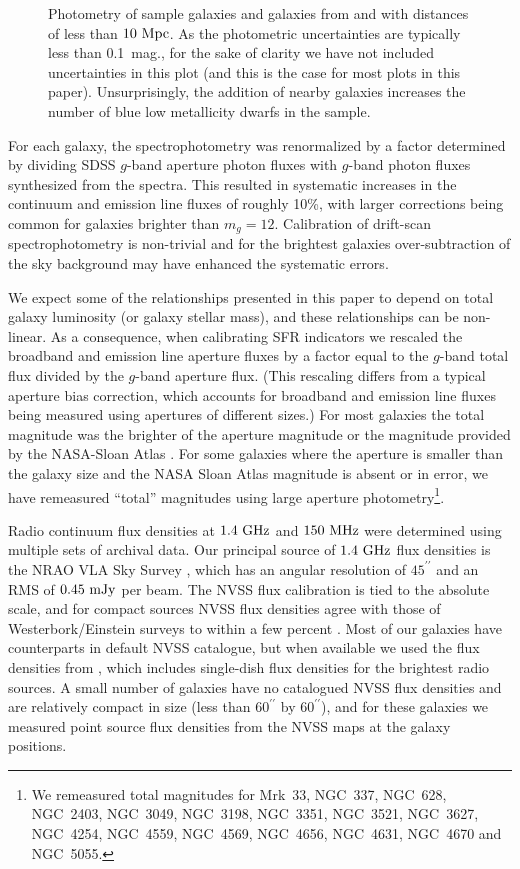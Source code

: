 \documentclass[preprint]{aastex61}
\begin{document}
\begin{figure}
\caption{Photometry of \citet{bro14} sample galaxies and galaxies from \citet{mou06} and \citet{mou10} with distances of less than $10~{\rm Mpc}$. As the photometric uncertainties are typically less than 0.1~mag., for the sake of clarity we have not included uncertainties in this plot (and this is the case for most plots in this paper). Unsurprisingly, the addition of nearby galaxies increases the number of blue low metallicity dwarfs in the sample.}
\label{fig:ugr}
\end{figure}

For each galaxy, the spectrophotometry was renormalized by a factor determined by dividing SDSS $g$-band aperture photon fluxes with $g$-band photon fluxes synthesized from the spectra. This resulted in systematic increases in the continuum and emission line fluxes of roughly 10\%, with larger corrections being common for galaxies brighter than $m_g=12$. Calibration of drift-scan spectrophotometry is non-trivial \citep[i.e.,][]{mou06,ken08} and for the brightest galaxies over-subtraction of the sky background may have enhanced the systematic errors. 

We expect some of the relationships presented in this paper to depend on total galaxy luminosity (or galaxy stellar mass), and these relationships can be non-linear. As a consequence, when calibrating SFR indicators we rescaled the broadband and emission line aperture fluxes by a factor equal to the $g$-band total flux divided by the $g$-band aperture flux. (This rescaling differs from a typical aperture bias correction, which accounts for broadband and emission line fluxes being measured using apertures of different sizes.) For most galaxies the total magnitude was the brighter of the aperture magnitude or the magnitude provided by the NASA-Sloan Atlas \citep{bla11}. For some galaxies where the aperture is smaller than the galaxy size and the NASA Sloan Atlas magnitude is absent or in error, we have remeasured ``total'' magnitudes using large aperture photometry\footnote{We remeasured total magnitudes for Mrk~33, NGC~337, NGC~628, NGC~2403, NGC~3049, NGC~3198, NGC~3351, NGC~3521, NGC~3627, NGC~4254, NGC~4559, NGC~4569, NGC~4656, NGC~4631, NGC~4670 and NGC~5055.}.

Radio continuum flux densities at $1.4~{\rm GHz}$ and $150~{\rm MHz}$ were determined using multiple sets of archival data. Our principal source of $1.4~{\rm GHz}$ flux densities is the NRAO VLA Sky Survey \citep[NVSS][]{con98}, which has an angular resolution of $45^{\prime\prime}$ and an RMS of $0.45~{\rm mJy}$ per beam. The NVSS flux calibration is tied to the \citet{baa77} absolute scale, and for compact sources NVSS flux densities agree with those of Westerbork/Einstein surveys to within a few percent \citep{con98}. Most of our galaxies have counterparts in default NVSS catalogue, but when available we used the flux densities from \citet{con02}, which includes single-dish flux densities for the brightest radio sources. A small number of galaxies have no catalogued NVSS flux densities and are relatively compact in size (less than $60^{\prime\prime}$ by $60^{\prime\prime}$), and for these galaxies we measured point source flux densities from the NVSS maps at the galaxy positions. 
\end{document}
